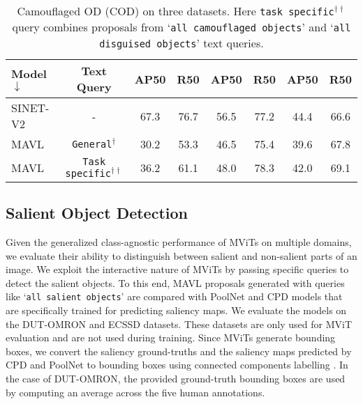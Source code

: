 \documentclass[runningheads]{llncs}
\newcommand{\txt}[1]{{\texttt{#1}}}
\begin{document}
\begin{table}[!t]
\begin{subtable}[t]{0.55\linewidth}
{\begin{tabular}{l *{7}{c}}
          \rowcolor{Gray} Model $\downarrow$ & Text Query & AP50 & R50 & AP50 & R50 & AP50 & R50 \\
          \midrule
          SINET-V2 \cite{SINET-V2} & - & 67.3 & 76.7 & 56.5 & 77.2 & 44.4 & 66.6 \\
          \rowcolor{orange!6}
          MAVL & \txt{General$^{\dagger}$} & 30.2	& 53.3	& 46.5	& 75.4 & 39.6 & 67.8 \\
          \rowcolor{orange!6}
          MAVL & \txt{Task specific$^{\dagger \dagger}$} & 36.2 & 61.1 & 48.0 & 78.3 & 42.0 & 69.1 \\
          \bottomrule                             
        \end{tabular}
    }
    \caption{Camouflaged OD (COD) on three datasets. Here \txt{task specific$^{\dagger \dagger}$} query combines proposals from ‘\txt{all camouflaged objects}' and ‘\txt{all disguised objects}' text queries.}
    \label{table12:cod}
  \end{subtable}
\end{table}

\subsection{Salient Object Detection}
Given the generalized class-agnostic performance of MViTs on multiple domains, we evaluate their ability to distinguish between salient and non-salient parts of an image. We exploit the interactive nature of MViTs by passing specific queries to detect the salient objects. 
To this end, MAVL proposals generated with queries like ‘\txt{all salient objects}' are compared with PoolNet \cite{liu2019simple} and CPD \cite{wu2019cascaded} models that are specifically trained for predicting saliency maps. We evaluate the models on the DUT-OMRON \cite{yang2013saliency} and ECSSD \cite{shi2015hierarchical} datasets. These datasets are only used for MViT evaluation and are not used during training. Since MViTs generate bounding boxes, we convert the saliency ground-truths and the saliency maps predicted by CPD and PoolNet to bounding boxes using connected components labelling \cite{wu2005optimizing}. In the case of DUT-OMRON, the provided ground-truth bounding boxes are used by computing an average across the five human annotations. 
\end{document}
